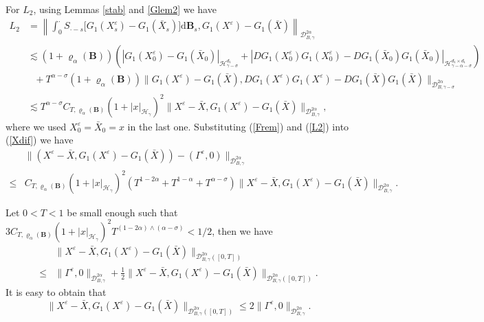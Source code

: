 \documentclass[10pt,a4paper]{article}
\numberwithin{equation}{section}
\begin{document}
For $L_2$, using Lemmas \ref{stab} and \ref{Glem2} we have
\begin{align}\label{L2}
L_2&=\left\|\int_0^\cdot S_{\cdot-s} \big[G_1(X_s^\varepsilon)-G_1(\bar{X}_s) \big] \mathrm{d} \mathbf B_s, G_1(X^\varepsilon)-G_1(\bar{X})  \right\|_{\mathcal{D}_{ B,\gamma}^{2\alpha}}   \nonumber\\
& \lesssim (1+\varrho_{\alpha}(\mathbf{B}) ) \left( |G_1(X_0^\varepsilon)-G_1(\bar{X}_0)|_{\mathcal H_{\gamma-\sigma}^{d_1} }+|DG_1(X_0^\varepsilon)G_1(X_0^\varepsilon)-DG_1(\bar{X}_0)G_1(\bar{X}_0)|_{\mathcal H_{\gamma-\alpha-\sigma}^{d_1 \times d_1} } \right) \nonumber\\
&~~~ + T^{\alpha-\sigma}(1+\varrho_{\alpha}(\mathbf{B}))  \|G_1(X^\varepsilon)-G_1(\bar{X}),DG_1(X^\varepsilon)G_1(X^\varepsilon)-DG_1(\bar{X})G_1(\bar{X})\|_{\mathcal{D}_{ B,\gamma-\sigma}^{2\alpha}} \nonumber\\
& \lesssim T^{\alpha-\sigma} C_{T,\varrho_{\alpha}(\mathbf{B})} (1+|x|_{\mathcal H_\gamma})^2 \|X^\varepsilon-\bar{X},G_1(X^\varepsilon)-G_1(\bar{X})\|_{\mathcal{D}_{ B,\gamma}^{2\alpha}},
\end{align}
where we used $X_0^\varepsilon=\bar{X}_0=x$ in the last one.
Substituting (\ref{Frem}) and (\ref{L2}) into (\ref{Xdif}) we have
\begin{align*}
&\|(X^\varepsilon-\bar{X}, G_1(X^\varepsilon)-G_1(\bar{X}))-(\varGamma^\varepsilon,0)\|_{\mathcal{D}_{ B,\gamma}^{2\alpha}} \nonumber\\
\leq& C_{T,\varrho_{\alpha}(\mathbf{B})} (1+|x|_{\mathcal H_\gamma})^2 (T^{1-2\alpha} +T^{1-\alpha}+T^{\alpha-\sigma}) \|X^\varepsilon-\bar{X},G_1(X^\varepsilon)-G_1(\bar{X})\|_{\mathcal{D}_{ B,\gamma}^{2\alpha}}.
\end{align*}





Let $0<T<1$ be small enough such that $3 C_{T,\varrho_{\alpha}(\mathbf{B})} (1+|x|_{\mathcal H_\gamma})^2 T^{(1-2\alpha)\wedge (\alpha-\sigma)} <1/2$, then we have
\begin{align*}
&\|X^\varepsilon-\bar{X}, G_1(X^\varepsilon)-G_1(\bar{X})\|_{\mathcal{D}_{B,\gamma}^{2\alpha}([0,T])} \nonumber\\
\leq &\|\varGamma^\varepsilon,0\|_{\mathcal{D}_{B,\gamma}^{2\alpha}}
+ \frac 12 \|X^\varepsilon-\bar{X},G_1(X^\varepsilon)-G_1(\bar{X})\|_{\mathcal{D}_{B,\gamma}^{2\alpha}([0,T])}.
\end{align*}
It is easy to obtain that
\begin{equation}\label{normT}
 \|X^\varepsilon-\bar{X}, G_1(X^\varepsilon)-G_1(\bar{X})\|_{\mathcal{D}_{B,\gamma}^{2\alpha}([0,T])} \leq 2 \|\varGamma^\varepsilon,0\|_{\mathcal{D}_{B,\gamma}^{2\alpha}}.
\end{equation}
\end{document}
